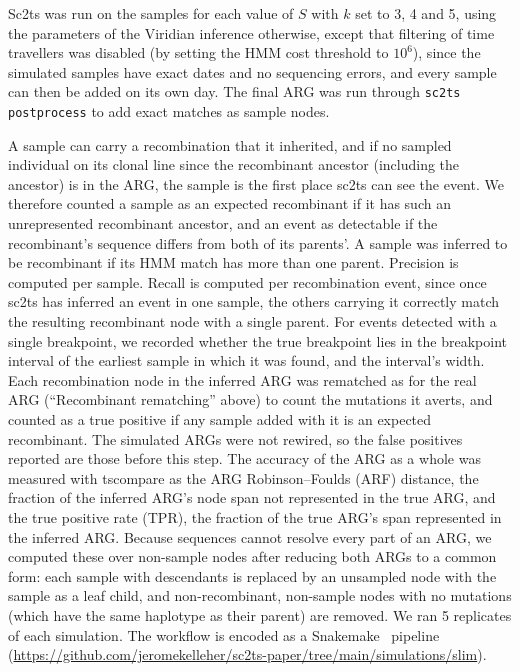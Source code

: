 \documentclass[12pt]{article}
\begin{document}
Sc2ts was run on the samples for each value of $S$
with $k$ set to 3, 4 and 5,
using the parameters of the Viridian inference otherwise,
except that filtering of time travellers was disabled
(by setting the HMM cost threshold to $10^6$),
since the simulated samples have exact dates and no sequencing errors,
and every sample can then be added on its own day.
The final ARG was run through \texttt{sc2ts postprocess}
to add exact matches as sample nodes.

A sample can carry a recombination that it inherited,
and if no sampled individual on its clonal line since the recombinant
ancestor (including the ancestor) is in the ARG,
the sample is the first place sc2ts can see the event.
We therefore counted a sample as an expected recombinant
if it has such an unrepresented recombinant ancestor,
and an event as detectable if the recombinant's sequence
differs from both of its parents'.
A sample was inferred to be recombinant if its HMM match has more than one parent.
Precision is computed per sample.
Recall is computed per recombination event,
since once sc2ts has inferred an event in one sample,
the others carrying it correctly match the resulting recombinant node
with a single parent.
For events detected with a single breakpoint, we recorded
whether the true breakpoint lies in the breakpoint interval
of the earliest sample in which it was found, and the interval's width.
Each recombination node in the inferred ARG was rematched
as for the real ARG (``Recombinant rematching'' above)
to count the mutations it averts,
and counted as a true positive if any sample added with it is an expected recombinant.
The simulated ARGs were not rewired,
so the false positives reported are those before this step.
The accuracy of the ARG as a whole was measured with
tscompare\cite{Fritze2024forest}
as the ARG Robinson--Foulds (ARF) distance,
the fraction of the inferred ARG's node span not represented in the true ARG,
and the true positive rate (TPR),
the fraction of the true ARG's span represented in the inferred ARG.
Because sequences cannot resolve every part of an ARG,
we computed these over non-sample nodes after reducing both ARGs
to a common form: each sample with descendants
is replaced by an unsampled node with the sample as a leaf child,
and non-recombinant, non-sample nodes with no mutations
(which have the same haplotype as their parent) are removed.
We ran 5 replicates of each simulation.
The workflow is encoded as a Snakemake~\cite{Koster2012snakemake} pipeline
(\url{https://github.com/jeromekelleher/sc2ts-paper/tree/main/simulations/slim}).
\end{document}
